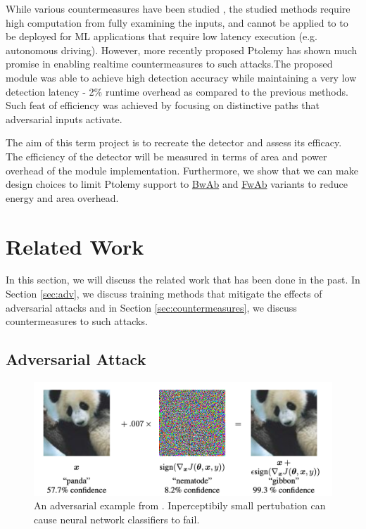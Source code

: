 \documentclass[11pt]{article}
\begin{document}
While various countermeasures have been studied \cite{detected,ensembles}, the studied methods require high computation from fully examining the inputs, and cannot be applied to to be deployed for ML applications that require low latency execution (e.g. autonomous driving). However, more recently proposed Ptolemy \cite{ptolemy} has shown much promise in enabling realtime countermeasures to such attacks.The proposed module was able to achieve high detection accuracy while maintaining a very low detection latency - 2\% runtime overhead as compared to the previous methods. Such feat of efficiency was achieved by focusing on distinctive paths that adversarial inputs activate.

The aim of this term project is to recreate the detector and assess its efficacy. The efficiency of the detector will be measured in terms of area and power overhead of the module implementation. Furthermore, we show that we can make design choices to limit Ptolemy support to \underline{BwAb} and \underline{FwAb} variants to reduce energy and area overhead.

\section{Related Work}

In this section, we will discuss the related work that has been done in the past. In Section \ref{sec:adv}, we discuss training methods that mitigate the effects of adversarial attacks and in Section \ref{sec:countermeasures}, we discuss countermeasures to such attacks. 

\subsection{Adversarial Attack\label{sec:adv}}

\begin{figure}[H]
\begin{center}
\includegraphics[width=\textwidth]{images/panda.png}
\end{center}
\caption{An adversarial example from \cite{Goodfellow2015adversarial}. Inperceptibily small pertubation can cause neural network classifiers to fail.}
\label{fig:panda}
\end{figure}
\end{document}
